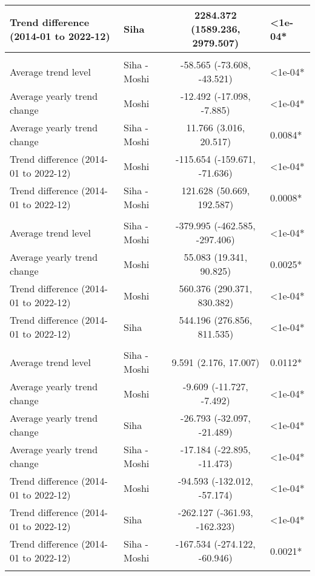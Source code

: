 \begin{longtable}{l|lcl}
Trend difference (2014-01 to 2022-12) & Siha & 2284.372 (1589.236, 2979.507) & <1e-04* \\ 
\midrule\addlinespace[2.5pt]
\multicolumn{4}{l}{Trauma} \\ 
\midrule\addlinespace[2.5pt]
Average trend level & Siha - Moshi & -58.565 (-73.608, -43.521) & <1e-04* \\ 
Average yearly trend change & Moshi & -12.492 (-17.098, -7.885) & <1e-04* \\ 
Average yearly trend change & Siha - Moshi & 11.766 (3.016, 20.517) & 0.0084* \\ 
Trend difference (2014-01 to 2022-12) & Moshi & -115.654 (-159.671, -71.636) & <1e-04* \\ 
Trend difference (2014-01 to 2022-12) & Siha - Moshi & 121.628 (50.669, 192.587) & 0.0008* \\ 
\midrule\addlinespace[2.5pt]
\multicolumn{4}{l}{Urinary Infections} \\ 
\midrule\addlinespace[2.5pt]
Average trend level & Siha - Moshi & -379.995 (-462.585, -297.406) & <1e-04* \\ 
Average yearly trend change & Moshi & 55.083 (19.341, 90.825) & 0.0025* \\ 
Trend difference (2014-01 to 2022-12) & Moshi & 560.376 (290.371, 830.382) & <1e-04* \\ 
Trend difference (2014-01 to 2022-12) & Siha & 544.196 (276.856, 811.535) & <1e-04* \\ 
\midrule\addlinespace[2.5pt]
\multicolumn{4}{l}{Vector-borne Infections} \\ 
\midrule\addlinespace[2.5pt]
Average trend level & Siha - Moshi & 9.591 (2.176, 17.007) & 0.0112* \\ 
Average yearly trend change & Moshi & -9.609 (-11.727, -7.492) & <1e-04* \\ 
Average yearly trend change & Siha & -26.793 (-32.097, -21.489) & <1e-04* \\ 
Average yearly trend change & Siha - Moshi & -17.184 (-22.895, -11.473) & <1e-04* \\ 
Trend difference (2014-01 to 2022-12) & Moshi & -94.593 (-132.012, -57.174) & <1e-04* \\ 
Trend difference (2014-01 to 2022-12) & Siha & -262.127 (-361.93, -162.323) & <1e-04* \\ 
Trend difference (2014-01 to 2022-12) & Siha - Moshi & -167.534 (-274.122, -60.946) & 0.0021* \\ 
\midrule\addlinespace[2.5pt]
\multicolumn{4}{l}{Malnutrition} \\ 

\end{longtable}
